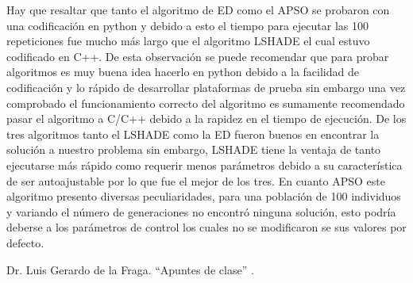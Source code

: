 \documentclass[conference]{IEEEtran}
\begin{document}
Hay que resaltar que tanto el algoritmo de ED como el APSO se probaron con una codificación en python y debido a esto el tiempo para ejecutar las 100 repeticiones fue mucho más largo que el algoritmo LSHADE el cual estuvo codificado en C++. De esta observación se puede recomendar que para probar algoritmos es muy buena idea hacerlo en python debido a la facilidad de codificación y lo rápido de desarrollar plataformas de prueba sin embargo una vez comprobado el funcionamiento correcto del algoritmo es sumamente recomendado pasar el algoritmo a C/C++ debido a la rapidez en el tiempo de ejecución. De los tres algoritmos tanto el LSHADE como la ED fueron buenos en encontrar la solución a nuestro problema sin embargo, LSHADE tiene la ventaja de tanto ejecutarse más rápido como requerir menos parámetros debido a su característica de ser autoajustable por lo que fue el mejor de los tres. En cuanto APSO este algoritmo presento diversas peculiaridades, para una población de 100 individuos y variando el número de generaciones no encontró ninguna solución, esto podría deberse a los parámetros de control los cuales no se modificaron se sus valores por defecto. 

\begin{thebibliography}{00}
  Dr. Luis Gerardo de la Fraga. ``Apuntes de clase'' .
\end{thebibliography}
\end{document}

